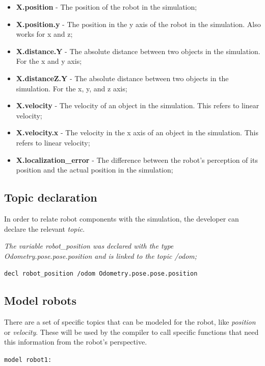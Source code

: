 \documentclass[runningheads]{llncs}
\begin{document}
\begin{itemize}
\item {\bfseries X.position} - The position of the robot in the simulation;
\item {\bfseries X.position.y} - The position in the y axis of the robot in the simulation. Also works for x and z;
\item {\bfseries X.distance.Y} - The absolute distance between two objects in the simulation. For the x and y axis;
\item {\bfseries X.distanceZ.Y} - The absolute distance between two objects in the simulation. For the x, y, and z axis;
\item {\bfseries X.velocity} - The velocity of an object in the simulation. This refers to linear velocity;
\item {\bfseries X.velocity.x} - The velocity in the x axis of an object in the simulation. This refers to linear velocity;
\item {\bfseries X.localization\_error} - The difference between the robot's perception of its position and the actual position in the simulation;
\end{itemize}


\subsection{Topic declaration}

In order to relate robot components with the simulation, the developer can declare the relevant \textit{topic}.

\textit{The variable robot\_position was declared with the type Odometry.pose.pose.position and is linked to the topic /odom;}

\vspace{3mm}

\texttt{decl robot\_position /odom Odometry.pose.pose.position}


\subsection{Model robots}

There are a set of specific topics that can be modeled for the robot, like \textit{position} or \textit{velocity}. These will be used by the compiler to call specific functions that need this information from the robot's perspective.

\vspace{3mm}

\texttt{model robot1:}
\end{document}
